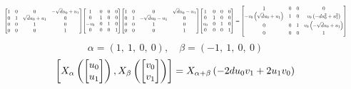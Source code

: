 \documentclass[11pt]{article}
\theoremstyle{definition}
\begin{document}
\[
\scaletoalign{\textwidth}{{\left[\begin{matrix}1 & 0 & 0 & - \sqrt{d} u_{0} + u_{1}\\0 & 1 & \sqrt{d} u_{0} + u_{1} & 0\\0 & 0 & 1 & 0\\0 & 0 & 0 & 1\end{matrix}\right]} {\left[\begin{matrix}1 & 0 & 0 & 0\\0 & 1 & 0 & 0\\- v_{0} & 0 & 1 & 0\\0 & 0 & 0 & 1\end{matrix}\right]} {\left[\begin{matrix}1 & 0 & 0 & \sqrt{d} u_{0} - u_{1}\\0 & 1 & - \sqrt{d} u_{0} - u_{1} & 0\\0 & 0 & 1 & 0\\0 & 0 & 0 & 1\end{matrix}\right]} {\left[\begin{matrix}1 & 0 & 0 & 0\\0 & 1 & 0 & 0\\v_{0} & 0 & 1 & 0\\0 & 0 & 0 & 1\end{matrix}\right]} = {\left[\begin{matrix}1 & 0 & 0 & 0\\- v_{0} \left(\sqrt{d} u_{0} + u_{1}\right) & 1 & 0 & v_{0} \left(- d u_{0}^{2} + u_{1}^{2}\right)\\0 & 0 & 1 & v_{0} \left(- \sqrt{d} u_{0} + u_{1}\right)\\0 & 0 & 0 & 1\end{matrix}\right]}}
\]
\[
\alpha = \left( 1, \  1, \  0, \  0\right), \quad \beta = \left( -1, \  1, \  0, \  0\right)
\]
\[
\scaletoalign{\textwidth}{\left[ X_{\alpha}\left(\left[\begin{matrix}u_{0}\\u_{1}\end{matrix}\right]\right), X_{\beta}\left(\left[\begin{matrix}v_{0}\\v_{1}\end{matrix}\right]\right) \right] = X_{\alpha + \beta}\left(- 2 d u_{0} v_{1} + 2 u_{1} v_{0}\right)}
\]
\end{document}
